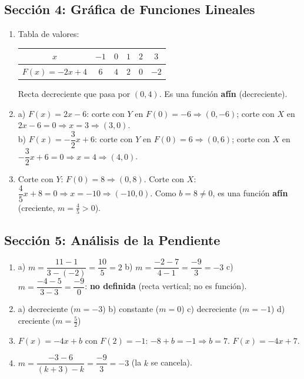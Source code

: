 \documentclass[12pt, letterpaper]{article}
\begin{document}
  \newpage

  \subsection*{Sección 4: Gráfica de Funciones Lineales}

  \begin{enumerate}[leftmargin=*, label=\textbf{\arabic*.}]
    \item Tabla de valores:
          \begin{center}
            \begin{tabular}{c|ccccc}
              \toprule
              $x$              & $-1$ & $0$ & $1$ & $2$ & $3$ \\
              \midrule
              $F(x) = -2x + 4$ & $6$  & $4$ & $2$ & $0$ & $-2$ \\
              \bottomrule
            \end{tabular}
          \end{center}
          Recta decreciente que pasa por $(0,4)$. Es una función \textbf{afín} (decreciente).

    \item a) $F(x) = 2x - 6$: corte con $Y$ en $F(0) = -6 \Rightarrow (0,-6)$; corte con $X$ en $2x - 6 = 0 \Rightarrow x = 3 \Rightarrow (3,0)$.
          \\[2pt]
          b) $F(x) = -\dfrac{3}{2}x + 6$: corte con $Y$ en $F(0) = 6 \Rightarrow (0,6)$; corte con $X$ en $-\dfrac{3}{2}x + 6 = 0 \Rightarrow x = 4 \Rightarrow (4,0)$.

    \item Corte con $Y$: $F(0) = 8 \Rightarrow (0,8)$. Corte con $X$: $\dfrac{4}{5}x + 8 = 0 \Rightarrow x = -10 \Rightarrow (-10, 0)$.
          Como $b = 8 \neq 0$, es una función \textbf{afín} (creciente, $m = \frac{4}{5} > 0$).
  \end{enumerate}

  \newpage

  \subsection*{Sección 5: Análisis de la Pendiente}

  \begin{enumerate}[leftmargin=*, label=\textbf{\arabic*.}]
    \item a) $m = \dfrac{11 - 1}{3 - (-2)} = \dfrac{10}{5} = 2$ \quad
          b) $m = \dfrac{-2 - 7}{4 - 1} = \dfrac{-9}{3} = -3$ \quad
          c) $m = \dfrac{-4 - 5}{3 - 3} = \dfrac{-9}{0}$: \textbf{no definida} (recta vertical; no es función).

    \item a) decreciente ($m = -3$) \quad b) constante ($m = 0$) \quad c) decreciente ($m = -1$) \quad d) creciente ($m = \frac{5}{2}$)

    \item $F(x) = -4x + b$ con $F(2) = -1$: $-8 + b = -1 \Rightarrow b = 7$. \quad $F(x) = -4x + 7$.

    \item $m = \dfrac{-3 - 6}{(k+3) - k} = \dfrac{-9}{3} = -3$ (la $k$ se cancela).
  \end{enumerate}
\end{document}
